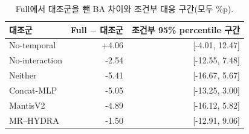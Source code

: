 \documentclass[11pt,a4paper]{article}
\numberwithin{equation}{section}
\begin{document}
\begin{table}[H]\centering\small
\caption{Full에서 대조군을 뺀 BA 차이와 조건부 대응 구간(모두 \%p).}
\begin{tabular}{@{}lrr@{}}\toprule
 대조군 & Full $-$ 대조군 & 조건부 95\% percentile 구간\\\midrule
No-temporal & +4.06 & [-4.01, 12.47] \\
No-interaction & -2.54 & [-12.55, 7.48] \\
Neither & -5.41 & [-16.67, 5.67] \\
Concat-MLP & -5.05 & [-13.25, 3.00] \\
MantisV2 & -4.89 & [-16.12, 5.82] \\
MR--HYDRA & -1.50 & [-12.91, 9.06] \\
\bottomrule\end{tabular}\label{tab:paired}
\end{table}
\end{document}
